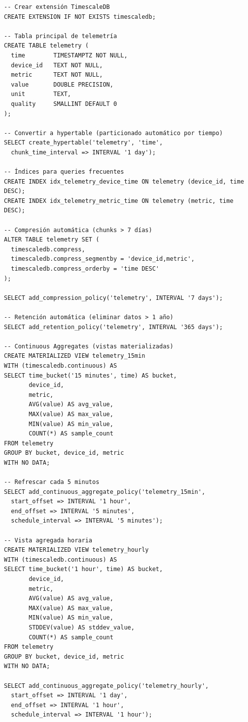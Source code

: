 \begin{verbatim}
-- Crear extensión TimescaleDB
CREATE EXTENSION IF NOT EXISTS timescaledb;

-- Tabla principal de telemetría
CREATE TABLE telemetry (
  time        TIMESTAMPTZ NOT NULL,
  device_id   TEXT NOT NULL,
  metric      TEXT NOT NULL,
  value       DOUBLE PRECISION,
  unit        TEXT,
  quality     SMALLINT DEFAULT 0
);

-- Convertir a hypertable (particionado automático por tiempo)
SELECT create_hypertable('telemetry', 'time', 
  chunk_time_interval => INTERVAL '1 day');

-- Índices para queries frecuentes
CREATE INDEX idx_telemetry_device_time ON telemetry (device_id, time DESC);
CREATE INDEX idx_telemetry_metric_time ON telemetry (metric, time DESC);

-- Compresión automática (chunks > 7 días)
ALTER TABLE telemetry SET (
  timescaledb.compress,
  timescaledb.compress_segmentby = 'device_id,metric',
  timescaledb.compress_orderby = 'time DESC'
);

SELECT add_compression_policy('telemetry', INTERVAL '7 days');

-- Retención automática (eliminar datos > 1 año)
SELECT add_retention_policy('telemetry', INTERVAL '365 days');

-- Continuous Aggregates (vistas materializadas)
CREATE MATERIALIZED VIEW telemetry_15min
WITH (timescaledb.continuous) AS
SELECT time_bucket('15 minutes', time) AS bucket,
       device_id,
       metric,
       AVG(value) AS avg_value,
       MAX(value) AS max_value,
       MIN(value) AS min_value,
       COUNT(*) AS sample_count
FROM telemetry
GROUP BY bucket, device_id, metric
WITH NO DATA;

-- Refrescar cada 5 minutos
SELECT add_continuous_aggregate_policy('telemetry_15min',
  start_offset => INTERVAL '1 hour',
  end_offset => INTERVAL '5 minutes',
  schedule_interval => INTERVAL '5 minutes');

-- Vista agregada horaria
CREATE MATERIALIZED VIEW telemetry_hourly
WITH (timescaledb.continuous) AS
SELECT time_bucket('1 hour', time) AS bucket,
       device_id,
       metric,
       AVG(value) AS avg_value,
       MAX(value) AS max_value,
       MIN(value) AS min_value,
       STDDEV(value) AS stddev_value,
       COUNT(*) AS sample_count
FROM telemetry
GROUP BY bucket, device_id, metric
WITH NO DATA;

SELECT add_continuous_aggregate_policy('telemetry_hourly',
  start_offset => INTERVAL '1 day',
  end_offset => INTERVAL '1 hour',
  schedule_interval => INTERVAL '1 hour');
\end{verbatim}

